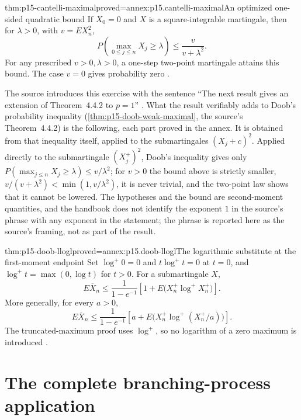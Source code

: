 \begin{hbtheorem}{thm:p15-cantelli-maximal}{proved=annex:p15.cantelli-maximal}{An optimized one-sided quadratic bound}
If \(X_0=0\) and \(X\) is a square-integrable martingale, then for
\(\lambda>0\), with \(v=EX_n^2\),
\[
                   P\left(\max_{0\leq j\leq n}X_j\geq\lambda\right)
                                      \leq\frac{v}{v+\lambda^2}.
\]
For any prescribed \(v>0,\lambda>0\), a one-step two-point martingale
attains this bound. The case \(v=0\) gives probability zero
\cite[ex.~4.4.7]{DurrettPTEAuthor2019}.

The source introduces this exercise with the sentence
``The next result gives an extension of Theorem~4.4.2 to \(p=1\)''
\cite[ex.~4.4.7, p.~239]{DurrettPTEAuthor2019}.
What the result verifiably adds to Doob's probability inequality
(\cref{thm:p15-doob-weak-maximal}, the source's Theorem~4.4.2) is the
following, each part proved in the annex. It is obtained from that
inequality itself, applied to the submartingales \((X_j+c)^2\).
Applied directly to the submartingale \((X_j^+)^2\), Doob's inequality
gives only \(P(\max_{j\leq n}X_j\geq\lambda)\leq v/\lambda^2\); for
\(v>0\) the bound above is strictly smaller,
\(v/(v+\lambda^2)<\min(1,v/\lambda^2)\), it is never trivial, and the
two-point law shows that it cannot be lowered. The hypotheses and the
bound are second-moment quantities, and the handbook does not identify
the exponent \(1\) in the source's phrase with any exponent in the
statement; the phrase is reported here as the source's framing, not as
part of the result.
\end{hbtheorem}

\begin{hbtheorem}{thm:p15-doob-llogl}{proved=annex:p15.doob-llogl}{The logarithmic substitute at the first-moment endpoint}
Set \(\log^+0=0\) and \(t\log^+t=0\) at \(t=0\), and
\(\log^+t=\max(0,\log t)\) for \(t>0\).
For a submartingale \(X\),
\[
      E\overline X_n
        \leq\frac1{1-e^{-1}}
                  \left[1+E\bigl(X_n^+\log^+X_n^+\bigr)\right].
\]
More generally, for every \(a>0\),
\[
      E\overline X_n
        \leq\frac1{1-e^{-1}}
                  \left[a+E\bigl(X_n^+\log^+(X_n^+/a)\bigr)\right].
\]
The truncated-maximum proof uses \(\log^+\), so no logarithm of a
zero maximum is introduced \cite[ex.~4.4.8]{DurrettPTEAuthor2019}.
\end{hbtheorem}

\section{The complete branching-process application}
\label{sec:p15-branching-second-moments}

